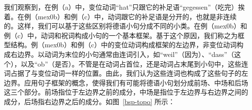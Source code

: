 我们观察到，在例（a）中，变位动词“hat”只跟它的补足语“gegessen”（吃完）挨着。在例（mex{0}b）和例（c）中，动词跟它的补足语是分开的，也就是非连续的。这样，我们可以基于这些区别将德语小句分成不同的小类。在例（mex{0}b）和例（c）中，动词和祝词构成小句的一个基本框架。基于这个原因，我们称之为框型结构。例（mex{0}b）和例（c）中的变位动词构成框架的左边界，非变位动词构成右边界。以动词为末位的小句通常由连词引入，如“weil”（因为）、“dass”（这个），以及“ob”（是否）。不管是在动词占首位，还是动词占末尾到小句中，这些连词占据了与变位动词一样的位置。由此，我们认为这些连词也构成了这些句子的左边界。应用句子框架的概念，使得我们有可能将德语小句划分成前场、中场和后场这三个部分。前场指位于左边界之前的成分，中场是指位于左边界与右边界之间的成分，后场指右边界之后的成分。如图~\vref{bsp-topo} 所示：
%
{}%
%
%
%
%
